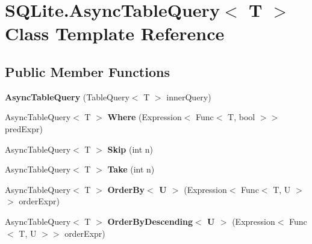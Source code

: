 \hypertarget{classSQLite_1_1AsyncTableQuery_3_01T_01_4}{\section{S\-Q\-Lite.\-Async\-Table\-Query$<$ T $>$ Class Template Reference}
\label{classSQLite_1_1AsyncTableQuery_3_01T_01_4}
}
\subsection*{Public Member Functions}
\begin{DoxyCompactItemize}
\item 
\hypertarget{classSQLite_1_1AsyncTableQuery_3_01T_01_4_a0255986ac768d5fca5b4e2c9840da35d}{{\bfseries Async\-Table\-Query} (Table\-Query$<$ T $>$ inner\-Query)}\label{classSQLite_1_1AsyncTableQuery_3_01T_01_4_a0255986ac768d5fca5b4e2c9840da35d}

\item 
\hypertarget{classSQLite_1_1AsyncTableQuery_3_01T_01_4_afe04f8363082a033b984230c7a245dea}{Async\-Table\-Query$<$ T $>$ {\bfseries Where} (Expression$<$ Func$<$ T, bool $>$$>$ pred\-Expr)}\label{classSQLite_1_1AsyncTableQuery_3_01T_01_4_afe04f8363082a033b984230c7a245dea}

\item 
\hypertarget{classSQLite_1_1AsyncTableQuery_3_01T_01_4_ab1b8210413273abe6bc9383bc4f7ea9c}{Async\-Table\-Query$<$ T $>$ {\bfseries Skip} (int n)}\label{classSQLite_1_1AsyncTableQuery_3_01T_01_4_ab1b8210413273abe6bc9383bc4f7ea9c}

\item 
\hypertarget{classSQLite_1_1AsyncTableQuery_3_01T_01_4_a6c47c652b3b8123e2d4961263c289af9}{Async\-Table\-Query$<$ T $>$ {\bfseries Take} (int n)}\label{classSQLite_1_1AsyncTableQuery_3_01T_01_4_a6c47c652b3b8123e2d4961263c289af9}

\item 
\hypertarget{classSQLite_1_1AsyncTableQuery_3_01T_01_4_a41540b08c3c49c123b57de8a0a5e3aea}{Async\-Table\-Query$<$ T $>$ {\bfseries Order\-By$<$ U $>$} (Expression$<$ Func$<$ T, U $>$$>$ order\-Expr)}\label{classSQLite_1_1AsyncTableQuery_3_01T_01_4_a41540b08c3c49c123b57de8a0a5e3aea}

\item 
\hypertarget{classSQLite_1_1AsyncTableQuery_3_01T_01_4_a4a45b5c81ccf4459f17d66fba6a18c3f}{Async\-Table\-Query$<$ T $>$ {\bfseries Order\-By\-Descending$<$ U $>$} (Expression$<$ Func$<$ T, U $>$$>$ order\-Expr)}\label{classSQLite_1_1AsyncTableQuery_3_01T_01_4_a4a45b5c81ccf4459f17d66fba6a18c3f}


\end{DoxyCompactItemize}
